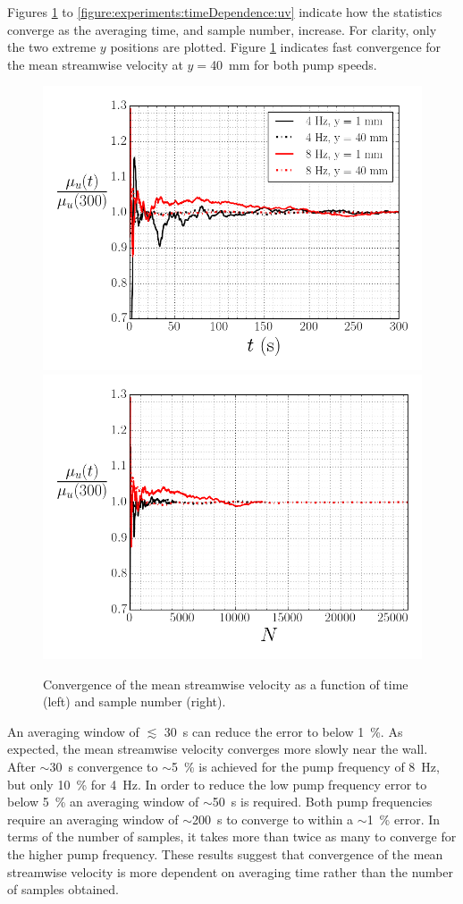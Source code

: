 \documentclass[12pt,oneside,a4paper]{article}
\begin{document}
Figures \ref{figure:experiments:timeDependence:meanUx} to \ref{figure:experiments:timeDependence:uv} indicate how the statistics converge as the averaging time, and sample number, increase. For clarity, only the two extreme $y$ positions are plotted. Figure  \ref{figure:experiments:timeDependence:meanUx} indicates fast convergence for the mean streamwise velocity at $y=$\SI{40}{mm} for both pump speeds.
%
\begin{figure}[!t]
\centering
\includegraphics[width=0.5\linewidth]{images/LDA_timeDependenceImages/UxMeanTConvergence.png}\hfill
\includegraphics[width=0.5\linewidth]{images/LDA_timeDependenceImages/UxMeanNConvergence.png}\\
\caption{Convergence of the mean streamwise velocity as a function of time (left) and sample number (right).}
\label{figure:experiments:timeDependence:meanUx}
\end{figure}
%
 An averaging window of $\lesssim$ \SI{30}{s} can reduce the error to below \SI{1}{\%}. As expected, the mean streamwise velocity converges more slowly near the wall. After $\sim$\SI{30}{s} convergence to $\sim$\SI{5}{\%} is achieved for the pump frequency of \SI{8}{Hz}, but only \SI{10}{\%} for \SI{4}{Hz}. In order to reduce the low pump frequency error to below \SI{5}{\%} an averaging window of $\sim$\SI{50}{s} is required. Both pump frequencies require an averaging window of $\sim$\SI{200}{s} to converge to within a $\sim$\SI{1}{\%} error. In terms of the number of samples, it takes more than twice as many to converge for the higher pump frequency. These results suggest that convergence of the mean streamwise velocity is more dependent on averaging time rather than the number of samples obtained. 
 
\end{document}
